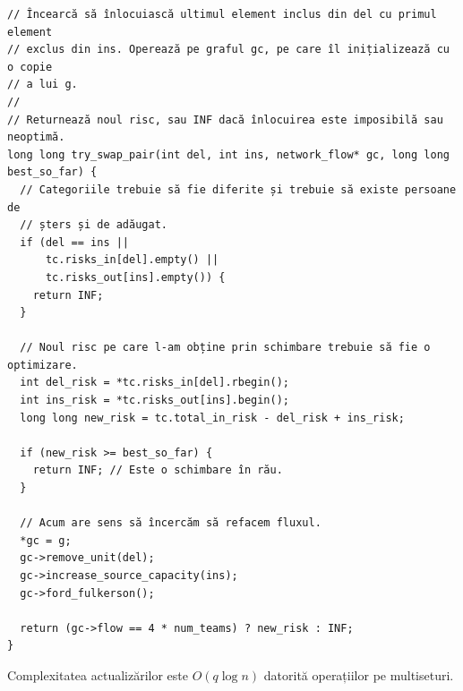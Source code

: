 \documentclass[../main.tex]{subfiles}
\begin{document}
\begin{verbatim}
// Încearcă să înlocuiască ultimul element inclus din del cu primul element
// exclus din ins. Operează pe graful gc, pe care îl inițializează cu o copie
// a lui g.
//
// Returnează noul risc, sau INF dacă înlocuirea este imposibilă sau neoptimă.
long long try_swap_pair(int del, int ins, network_flow* gc, long long best_so_far) {
  // Categoriile trebuie să fie diferite și trebuie să existe persoane de
  // șters și de adăugat.
  if (del == ins ||
      tc.risks_in[del].empty() ||
      tc.risks_out[ins].empty()) {
    return INF;
  }

  // Noul risc pe care l-am obține prin schimbare trebuie să fie o optimizare.
  int del_risk = *tc.risks_in[del].rbegin();
  int ins_risk = *tc.risks_out[ins].begin();
  long long new_risk = tc.total_in_risk - del_risk + ins_risk;

  if (new_risk >= best_so_far) {
    return INF; // Este o schimbare în rău.
  }

  // Acum are sens să încercăm să refacem fluxul.
  *gc = g;
  gc->remove_unit(del);
  gc->increase_source_capacity(ins);
  gc->ford_fulkerson();

  return (gc->flow == 4 * num_teams) ? new_risk : INF;
}
\end{verbatim}

Complexitatea actualizărilor este $O(q \log n)$ datorită operațiilor pe multiseturi.
\end{document}
